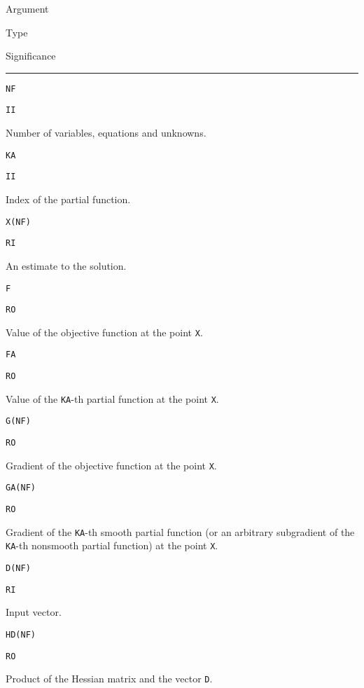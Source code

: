 \documentclass{esub2acm}
\begin{document}
\vspace{3mm}

\small

\noindent\parbox{20mm}{Argument}\parbox{10mm}{$\!$Type}\parbox[t]{125mm}
  {Significance}\par\noindent\rule[1mm]{155mm}{.4pt}
  \par
\noindent\parbox{20mm}{\tt NF}\parbox{10mm}{\tt II}\parbox[t]{125mm}{
  Number of variables, equations and unknowns.}
  \par\vspace{2mm}
\noindent\parbox{20mm}{\tt KA}\parbox{10mm}{\tt II}\parbox[t]{125mm}{
  Index of the partial function.}
  \par\vspace{2mm}
\noindent\parbox{20mm}{\tt X(NF)}\parbox{10mm}{\tt RI}\parbox[t]{125mm}{
  An estimate to the solution.}
  \par\vspace{2mm}
\noindent\parbox{20mm}{\tt F}\parbox{10mm}{\tt RO}\parbox[t]{125mm}{
  Value of the objective function at the point {\tt X}.}
  \par\vspace{2mm}
\noindent\parbox{20mm}{\tt FA}\parbox{10mm}{\tt RO}\parbox[t]{125mm}{
  Value of the {\tt KA}-th partial function at the point {\tt X}.}
  \par\vspace{2mm}
\noindent\parbox{20mm}{\tt G(NF)}\parbox{10mm}{\tt RO}\parbox[t]{125mm}{
  Gradient of the objective function at the point {\tt X}.}
  \par\vspace{2mm}
\noindent\parbox{20mm}{\tt GA(NF)}\parbox{10mm}{\tt RO}\parbox[t]{125mm}{
  Gradient of the {\tt KA}-th smooth partial function (or an arbitrary
  subgradient of the {\tt KA}-th nonsmooth partial function)
  at the point {\tt X}.}
  \par\vspace{2mm}
\noindent\parbox{20mm}{\tt D(NF)}\parbox{10mm}{\tt RI}\parbox[t]{125mm}{
  Input vector.}
  \par\vspace{2mm}
\noindent\parbox{20mm}{\tt HD(NF)}\parbox{10mm}{\tt RO}\parbox[t]{125mm}{
  Product of the Hessian matrix and the vector {\tt D}.}
  \par

\rm

\vspace{8mm}

\end{document}
